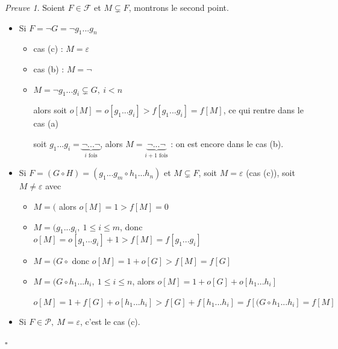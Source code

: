 \documentclass[]{article}
\theoremstyle{remark}
\newtheorem{myproof}{Preuve}
\theoremstyle{definition}
\newcommand{\cqfd}{
	\hfill$\square$
}
\begin{document}
\begin{myproof}
	Soient $F \in \mathcal{F}$ et $M \subsetneq F$, montrons le second point.
	
	\begin{itemize}
		\item Si $F=\neg G = \neg g_1 ... g_n$
		
		\begin{itemize}
			\item cas (c) : $M=\varepsilon$
			\item cas (b) : $M=\neg$
			\item $M=\neg g_1 ... g_i \subsetneq G, ~ i < n$
			
			alors soit $o[M] = o[g_1...g_i] > f[g_1 ... g_i] = f[M]$, ce qui rentre dans le cas (a)
			
			soit $g_1...g_i = \underbrace{\neg ... \neg}_{i \text{ fois}}$, alors $M=\underbrace{\neg ... \neg}_{i + 1 \text{ fois}}$ : on est encore dans le cas (b).
		\end{itemize}
		
		\item Si $F=(G \circ H) = (g_1 ... g_m \circ h_1 ... h_n)$ et $M \subsetneq F$, soit $M=\varepsilon$ (cas (c)), soit $M \neq \varepsilon$ avec
		
		\begin{itemize}
			\item $M=($ alors $o[M]=1 > f[M] = 0$
			\item $M=(g_1...g_i, ~ 1 \leqslant i \leqslant m$, donc $o[M]=o[g_1...g_i] + 1 > f[M] = f[g_1...g_i]$
			\item $M=(G \circ$ donc $o[M]=1+o[G] > f[M]=f[G]$
			\item $M=(G \circ h_1 ... h_i, ~ 1 \leqslant i \leqslant n$, alors $o[M] = 1 + o[G] + o[h_1...h_i]$
			
			$o[M] = 1 + f[G] + o[h_1...h_i] > f[G] + f[h_1...h_i] = f[(G \circ h_1...h_i] = f[M]$
		\end{itemize}
		
		\item Si $F \in \mathcal{P}, ~ M=\varepsilon$, c'est le cas (c).
	\end{itemize}
	
	\cqfd
\end{myproof}
\end{document}

